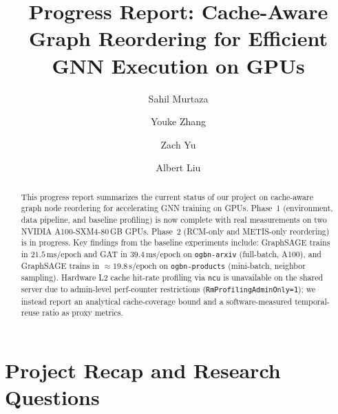 \documentclass[sigconf,review]{acmart}
\begin{document}
\title{Progress Report: Cache-Aware Graph Reordering for Efficient GNN Execution on GPUs}

\author{Sahil Murtaza}

\author{Youke Zhang}

\author{Zach Yu}

\author{Albert Liu}

\begin{abstract}
This progress report summarizes the current status of our project on
cache-aware graph node reordering for accelerating GNN training on GPUs.
Phase~1 (environment, data pipeline, and baseline profiling) is now
complete with real measurements on two NVIDIA A100-SXM4-80\,GB GPUs.
Phase~2 (RCM-only and METIS-only reordering) is in progress.
Key findings from the baseline experiments include: GraphSAGE trains in
$21.5\,\text{ms/epoch}$ and GAT in $39.4\,\text{ms/epoch}$ on
\texttt{ogbn-arxiv} (full-batch, A100), and GraphSAGE trains in
$\approx\!19.8\,\text{s/epoch}$ on \texttt{ogbn-products} (mini-batch,
neighbor sampling).  Hardware L2 cache hit-rate profiling via
\texttt{ncu} is unavailable on the shared server due to admin-level
perf-counter restrictions (\texttt{RmProfilingAdminOnly=1});  we instead
report an analytical cache-coverage bound and a software-measured
temporal-reuse ratio as proxy metrics.
\end{abstract}


\maketitle
\sloppy

\section{Project Recap and Research Questions}
\end{document}
